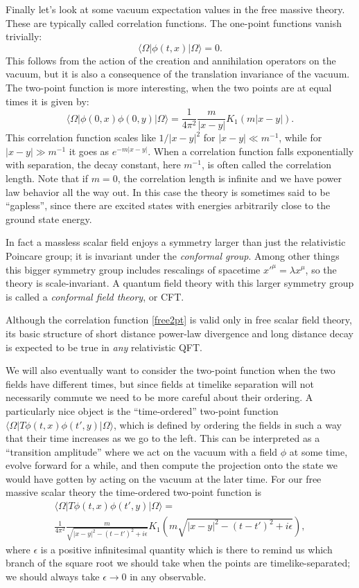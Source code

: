\documentclass[12pt]{article}
\newcommand{\be}{\begin{equation}}
\newcommand{\ee}{\end{equation}}
\newcommand{\lan}{\langle}
\newcommand{\ran}{\rangle}
\begin{document}
Finally let's look at some vacuum expectation values in the free massive theory.  These are typically called correlation functions.  The one-point functions vanish trivially:
\be
\lan\Omega|\phi(t,x)|\Omega\ran=0.
\ee
This follows from the action of the creation and annihilation operators on the vacuum, but it is also a consequence of the translation invariance of the vacuum.  The two-point function is more interesting, when the two points are at equal times it is given by:
\be\label{free2pt}
\lan \Omega|\phi(0,x)\phi(0,y)|\Omega\ran=\frac{1}{4\pi^2}\frac{m}{|x-y|}K_1(m |x-y|).
\ee
This correlation function scales like $1/|x-y|^2$ for $|x-y|\ll m^{-1}$, while for $|x-y|\gg m^{-1}$ it goes as $e^{-m|x-y|}$.  When a correlation function falls exponentially with separation, the decay constant, here $m^{-1}$, is often called the correlation length.  Note that if $m=0$, the correlation length is infinite and we have power law behavior all the way out.  In this case the theory is sometimes said to be ``gapless'', since there are excited states with energies arbitrarily close to the ground state energy.  

In fact a massless scalar field enjoys a symmetry larger than just the relativistic Poincare group; it is invariant under the \textit{conformal group}.  Among other things this bigger symmetry group includes rescalings of spacetime $x'^\mu=\lambda x^\mu$, so the theory is scale-invariant.  A quantum field theory with this larger symmetry group is called a \textit{conformal field theory}, or CFT.  

Although the correlation function \eqref{free2pt} is valid only in free scalar field theory, its basic structure of short distance power-law divergence and long distance decay is expected to be true in \textit{any} relativistic QFT.  

We will also eventually want to consider the two-point function when the two fields have different times, but since fields at timelike separation will not necessarily commute we need to be more careful about their ordering.  A particularly nice object is the ``time-ordered'' two-point function $\lan\Omega| T \phi(t,x)\phi(t',y)|\Omega\ran$, which is defined by ordering the fields in such a way that their time increases as we go to the left.  This can be interpreted as a ``transition amplitude'' where we act on the vacuum with a field $\phi$ at some time, evolve forward for a while, and then compute the projection onto the state we would have gotten by acting on the vacuum at the later time.  For our free massive scalar theory the time-ordered two-point function is
\begin{multline}
\label{to2pt}
\lan\Omega| T \phi(t,x)\phi(t',y)|\Omega\ran= \\ 
\frac{1}{4\pi^2}\frac{m}{\sqrt{|x-y|^2-(t-t')^2+i\epsilon}}K_1\left(m \sqrt{|x-y|^2-(t-t')^2+i\epsilon}\right),
\end{multline}
where $\epsilon$ is a positive infinitesimal quantity which is there to remind us which branch of the square root we should take when the points are timelike-separated; we should always take $\epsilon\to 0$ in any observable.  
\end{document}
